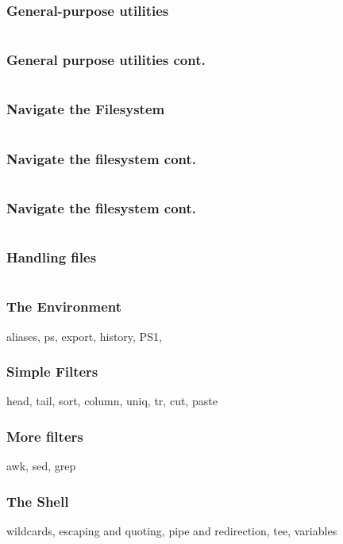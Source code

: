 \documentclass[hyperref={pdfpagelabels=false},12pt]{beamer}
\begin{document}
\begin{frame}
\frametitle{General-purpose utilities}
\centering
\inputminted[bgcolor=lightgray,linenos,fontsize=\footnotesize]{bash}{code/general-purpose-utilities-1.txt}
\end{frame}

\begin{frame}
\frametitle{General purpose utilities cont.}
\centering
\inputminted[bgcolor=lightgray,linenos,fontsize=\footnotesize]{bash}{code/general-purpose-utilities-2.txt}
\end{frame}

\begin{frame}
\frametitle{Navigate the Filesystem}
\centering
\inputminted[bgcolor=lightgray,linenos,fontsize=\footnotesize]{bash}{code/navigate-the-filesystem-1.txt}
\end{frame}

\begin{frame}
\frametitle{Navigate the filesystem cont.}
\centering
\inputminted[bgcolor=lightgray,linenos,fontsize=\footnotesize]{bash}{code/navigate-the-filesystem-2.txt}
\end{frame}

\begin{frame}
\frametitle{Navigate the filesystem cont.}
\centering
\inputminted[bgcolor=lightgray,linenos,fontsize=\footnotesize]{bash}{code/navigate-the-filesystem-3.txt}
\end{frame}

\begin{frame}
\frametitle{Handling files}
\centering
\inputminted[bgcolor=lightgray,linenos,fontsize=\footnotesize]{bash}{code/handling-files-1.txt}
\end{frame}

\begin{frame}
\frametitle{The Environment}
\centering
aliases, ps, export, history, PS1, 
\end{frame}

\begin{frame}
\frametitle{Simple Filters}
\centering
head, tail, sort, column, uniq, tr, cut, paste 
\end{frame}

\begin{frame}
\frametitle{More filters}
\centering
awk, sed, grep
\end{frame}

\begin{frame}
\frametitle{The Shell}
\centering
wildcards, escaping and quoting, pipe and redirection, tee, variables
\end{frame}
\end{document}
